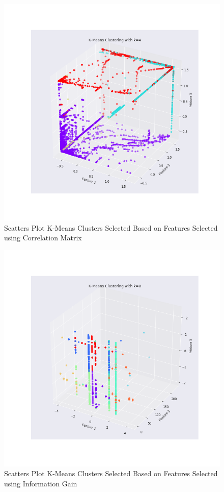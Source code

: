 \documentclass{article}
\begin{document}
\begin{figure}[htbp]
\centering
\includegraphics[scale=0.5]{figures/kmeans_cluster.png}
\caption{Scatters Plot K-Means Clusters Selected Based on Features Selected using Correlation Matrix}
\label{fig:IG_Cluters}
\end{figure}

\begin{figure}[htbp]
\centering
\includegraphics[scale=0.5]{figures/kmeans_cluster_1.png}
\caption{Scatters Plot K-Means Clusters Selected Based on Features Selected using Information Gain}
\label{fig:Corr_Clusters}
\end{figure}
\end{document}
